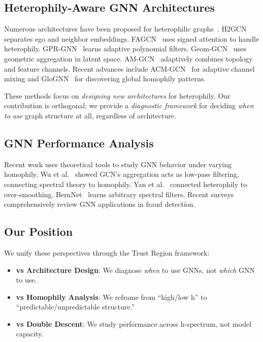\subsection{Heterophily-Aware GNN Architectures}

Numerous architectures have been proposed for heterophilic graphs~\cite{zheng2022graphsurvey}. H2GCN~\cite{zhu2020beyond} separates ego and neighbor embeddings. FAGCN~\cite{bo2021fagcn} uses signed attention to handle heterophily. GPR-GNN~\cite{chien2021gprgnn} learns adaptive polynomial filters. Geom-GCN~\cite{pei2020geomgcn} uses geometric aggregation in latent space. AM-GCN~\cite{wang2020amgcn} adaptively combines topology and feature channels. Recent advances include ACM-GCN~\cite{luan2022acmgcn} for adaptive channel mixing and GloGNN~\cite{li2022glognn} for discovering global homophily patterns.

These methods focus on \textit{designing new architectures} for heterophily. Our contribution is orthogonal: we provide a \textit{diagnostic framework} for deciding \textit{when to use} graph structure at all, regardless of architecture.

\subsection{GNN Performance Analysis}

Recent work uses theoretical tools to study GNN behavior under varying homophily. Wu et al.~\cite{wu2019sgc} showed GCN's aggregation acts as low-pass filtering, connecting spectral theory to homophily. Yan et al.~\cite{yan2022twophase} connected heterophily to over-smoothing. BernNet~\cite{he2022bernnet} learns arbitrary spectral filters. Recent surveys~\cite{gnnfraudsurvey2024, eswa2023fraudsurvey} comprehensively review GNN applications in fraud detection.

\subsection{Our Position}

We unify these perspectives through the Trust Region framework:
\begin{itemize}
    \item \textbf{vs Architecture Design}: We diagnose \textit{when} to use GNNs, not \textit{which} GNN to use.
    \item \textbf{vs Homophily Analysis}: We reframe from ``high/low h'' to ``predictable/unpredictable structure.''
    \item \textbf{vs Double Descent}: We study performance across h-spectrum, not model capacity.
\end{itemize}

